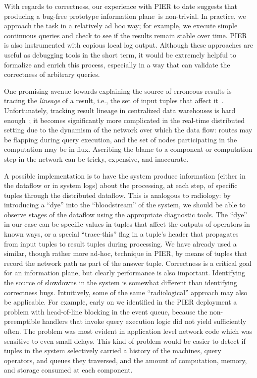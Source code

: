 \documentclass[10pt,twocolumn]{MyTightStyle}
\def\IP{information plane\xspace}
\begin{document}
With regards to correctness, our experience with PIER to date suggests
that producing a bug-free
prototype \IP\ is non-trivial.
In practice, we approach the task in a relatively ad
hoc way;  for example,
we execute simple continuous queries and check to see if
the results remain stable over time.  PIER is also instrumented with
copious local log output.  Although these approaches are useful as
debugging tools in the
short term, it would be extremely helpful to formalize and enrich
this process, especially in a way that can validate the
correctness of arbitrary queries.


One promising avenue towards explaining the source of erroneous
results is tracing the \emph{lineage} of a
result, i.e., the set of input tuples that
affect it~\cite{Woodruff1997}.  Unfortunately, tracking result
lineage in centralized data warehouses is hard
enough~\cite{Cui2001,Woodruff1997}; it becomes significantly more
complicated in the real-time
distributed setting due to the dynamism of the network over which the data
flow: routes may be flapping during query execution, and the set of
nodes participating in the computation may be in flux.  Ascribing the 
blame to a component or computation step in the network can be tricky,
expensive, and inaccurate.

A possible implementation is to have the system produce 
information (either in the dataflow or in system logs) about
the processing, at each step, of specific tuples through the 
distributed dataflow.  This is analogous to radiology: by
introducing a ``dye'' into the ``bloodstream'' of the system, we
should be able to observe stages of the dataflow using the appropriate
diagnostic tools.  The ``dye'' in our case can be specific
values in tuples that affect the outputs of operators in known
ways, or a special ``trace-this'' flag in a tuple's header that
propagates from input tuples to result tuples during processing.
We have already used a similar, though rather more ad-hoc, technique
in PIER, by means of tuples that record the network path as part of
the answer tuple.                                                               
Correctness is a critical goal for an \IP, but clearly performance is
also important.  Identifying the source of slowdowns in the system is
somewhat different than identifying correctness bugs.  Intuitively, some
of the
same ``radiological'' approach may also be applicable.  For example, early on we
identified in the PIER deployment a problem with head-of-line
blocking in the event
queue, because the non-preemptible handlers that invoke query execution logic did not
yield sufficiently often. The problem was most evident in application level network code which was sensitive to even small delays.
This kind of problem would be easier
to detect if tuples in the system selectively carried a history of the
machines, query operators, and queues they traversed, and the amount of
computation, memory, and storage consumed at each component.  
\end{document}

